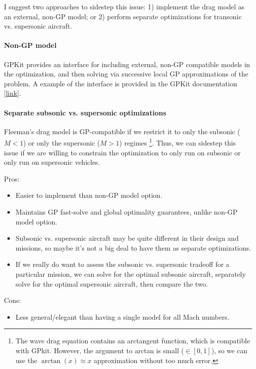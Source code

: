 \documentclass[12pt]{article}
\begin{document}
I suggest two approaches to sidestep this issue: 1) implement the drag model as an external, non-GP model; or 2) perform separate optimizations for transonic vs. supersonic aircraft.

\paragraph{Non-GP model}
GPKit provides an interface for including external, non-GP compatible models in the optimization, and then solving via successive local GP approximations of the problem.
A example of the interface is provided in the GPKit documentation [\href{https://gpkit.readthedocs.io/en/latest/signomialprogramming.html#sequential-geometric-programs}{link}].

\paragraph{Separate subsonic vs. supersonic optimizations}
Fleeman's drag model is GP-compatible if we restrict it to only the subsonic ($M<1$) or only the supersonic ($M > 1$) regimes \footnote{The wave drag equation contains an arctangent function, which is compatible with GPkit. However, the argument to arctan is small ($\in [0, 1]$), so we can use the $\arctan(x) \approx x$ approximation without too much error.}. Thus, we can sidestep this issue if we are willing to constrain the optimization to only run on subsonic or only run on supersonic vehicles.

Pros:
\begin{itemize}
    \item Easier to implement than non-GP model option.
    \item Maintains GP fast-solve and global optimality guarantees, unlike non-GP model option.
    \item Subsonic vs. supersonic aircraft may be quite different in their design and missions, so maybe it's not a big deal to have them as separate optimizations.
    \item If we really do want to assess the subsonic vs. supersonic tradeoff for a particular mission, we can solve for the optimal subsonic aircraft, separately solve for the optimal supersonic aircraft, then compare the two.
\end{itemize}

Cons:
\begin{itemize}
    \item Less general/elegant than having a single model for all Mach numbers.
\end{itemize}
\end{document}
